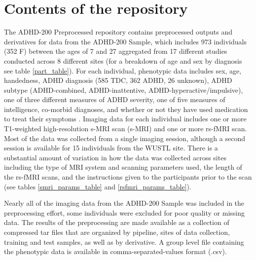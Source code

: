 \documentclass[preprint,12pt,3p]{elsarticle}
\begin{document}
\section{Contents of the repository}

The ADHD-200 Preprocessed repository contains preprocessed outputs and derivatives for data from the ADHD-200 Sample, which includes 973 individuals (352 F) between the ages of 7 and 27 aggregated from 17 different studies conducted across 8 different sites (for a breakdown of age and sex by diagnosis see table \ref{part_table}). For each individual, phenotypic data includes sex, age, handedness, ADHD diagnosis (585 TDC, 362 ADHD, 26 unknown), ADHD subtype (ADHD-combined, ADHD-inattentive, ADHD-hyperactive/impulsive), one of three different measures of ADHD severity, one of five measures of intelligence, co-morbid diagnoses, and whether or not they have used medication to treat their symptoms \cite{Milham2012}. Imaging data for each individual includes one or more T1-weighted high-resolution s-MRI scan (s-MRI) and one or more rs-fMRI scan. Most of the data was collected from a single imaging session, although a second session is available for 15 individuals from the WUSTL site. There is a substantial amount of variation in how the data was collected across sites including the type of MRI system and scanning parameters used, the length of the rs-fMRI scans, and the instructions given to the participants prior to the scan (see tables \ref{smri_params_table} and \ref{rsfmri_params_table}). 

Nearly all of the imaging data from the ADHD-200 Sample was included in the preprocessing effort, some individuals were excluded for poor quality or missing data. The results of the preprocessing are made available as a collection of compressed tar files that are organized by pipeline, sites of data collection, training and test samples, as well as by derivative. A group level file containing the phenotypic data is available in comma-separated-values format (.csv). 
\end{document}
